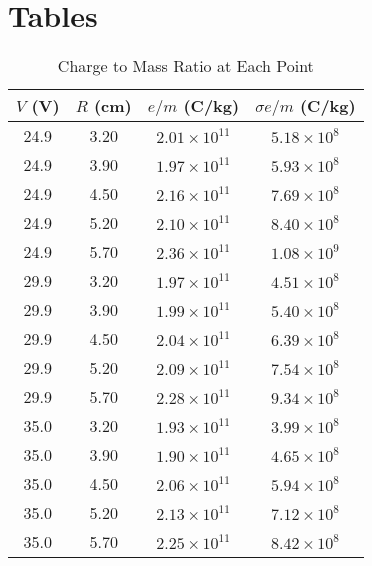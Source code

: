 \documentclass[journal, a4paper]{IEEEtran}
\begin{document}
\section{Tables}

\begin{table}[!hbt]
		\begin{center}
		\caption{Charge to Mass Ratio at Each Point}
		\label{tab:emRatio}
		\begin{tabular}{|c|c|c|c|}
			\hline
			$V$ (V) & $R$ (cm) & $e/m$ (C/kg) & $\sigma e/m$ (C/kg) \\
			\hline
			24.9 & 3.20 & $2.01 \times 10^{11}$ & $5.18 \times 10^8$\\
			\hline
			24.9 & 3.90 & $1.97 \times 10^{11}$ & $5.93 \times 10^8$\\
			\hline
			24.9 & 4.50 & $2.16 \times 10^{11}$ & $7.69 \times 10^8$\\
			\hline
            24.9 & 5.20 & $2.10 \times 10^{11}$ & $8.40 \times 10^8$\\
            \hline 
            24.9 & 5.70 & $2.36 \times 10^{11}$ & $1.08 \times 10^9$\\
            \hline
            29.9 & 3.20 & $1.97 \times 10^{11}$ & $4.51 \times 10^8$\\
            \hline
            29.9 & 3.90 & $1.99 \times 10^{11}$ & $5.40 \times 10^8$\\
            \hline
            29.9 & 4.50 & $2.04 \times 10^{11}$ & $6.39 \times 10^8$\\
            \hline
            29.9 & 5.20 & $2.09 \times 10^{11}$ & $7.54 \times 10^8$\\
            \hline
            29.9 & 5.70 & $2.28 \times 10^{11}$ & $9.34 \times 10^8$\\
            \hline
            35.0 & 3.20 & $1.93 \times 10^{11}$ & $3.99 \times 10^8$\\
            \hline
            35.0 & 3.90 & $1.90 \times 10^{11}$ & $4.65 \times 10^8$\\
            \hline
            35.0 & 4.50 & $2.06 \times 10^{11}$ & $5.94 \times 10^8$\\
            \hline
            35.0 & 5.20 & $2.13 \times 10^{11}$ & $7.12 \times 10^8$\\
           	\hline
            35.0 & 5.70 & $2.25 \times 10^{11}$ & $8.42 \times 10^8$\\
            \hline
		\end{tabular}
		\end{center}
	\end{table}
\end{document}
